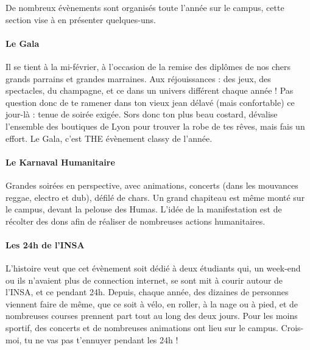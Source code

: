 De nombreux évènements sont organisés toute l'année sur le campus, cette section
vise à en présenter quelques-uns.

\paragraph{Le Gala}
Il se tient à la mi-février, à l'occasion de la remise des
diplômes de nos chers grands parrains et grandes marraines. Aux réjouissances :
des jeux, des spectacles, du champagne, et ce dans un univers différent chaque année !
Pas question donc de te ramener dans ton vieux jean délavé (mais confortable) ce
jour-là : tenue de soirée exigée. Sors donc ton plus beau costard, dévalise
l'ensemble des boutiques de Lyon pour trouver la robe de tes rêves, mais fais un
effort. Le Gala, c'est THE évènement classy de l'année.

\paragraph{Le Karnaval Humanitaire}
Grandes soirées en perspective, avec animations, concerts (dans les mouvances
reggae, electro et dub), défilé de chars. Un grand chapiteau est même monté sur le
campus, devant la pelouse des Humas. L'idée de la manifestation est de
récolter des dons afin de réaliser de nombreuses actions humanitaires.


 \paragraph{Les 24h de l'INSA}
 L'histoire veut que cet évènement soit dédié à deux étudiants qui, un
 week-end ou ils n'avaient plus de connection internet, se sont mit à courir
 autour de l'INSA, et ce pendant 24h. Depuis, chaque année, des dizaines de
 personnes viennent faire de même, que ce soit à vélo, en roller, à la nage ou à
 pied, et de nombreuses courses prennent part tout au long des deux jours. Pour les
 moins sportif, des concerts et de nombreuses animations ont lieu sur le
 campus. Crois-moi, tu ne vas pas t'ennuyer pendant les 24h !

